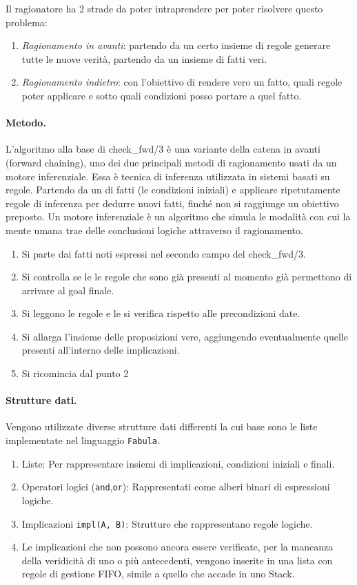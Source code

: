 \documentclass[12pt,twoside]{report}
\begin{document}
Il ragionatore ha 2 strade da poter intraprendere per poter risolvere questo problema:
\begin{enumerate}
    \item \textit{Ragionamento in avanti}: partendo da un certo insieme di regole generare tutte le nuove verità, partendo da un insieme di fatti veri.
    \item \textit{Ragionamento indietro}: con l'obiettivo di rendere vero un fatto, quali regole poter applicare e sotto quali condizioni posso portare a quel fatto.
\end{enumerate}

\paragraph{Metodo.} L'algoritmo alla base di check\_fwd/3 è una variante della catena in avanti (forward chaining), uno dei due principali metodi di ragionamento usati da un motore inferenziale.
Essa è tecnica di inferenza utilizzata in sistemi basati su regole. Partendo da un di fatti (le condizioni iniziali) e applicare ripetutamente regole di inferenza per dedurre nuovi fatti, finché non si raggiunge un obiettivo preposto.
Un motore inferenziale è un algoritmo che simula le modalità con cui la mente umana trae delle conclusioni logiche attraverso il ragionamento.

\begin{enumerate}
    \item Si parte dai fatti noti espressi nel secondo campo del check\_fwd/3.
    \item Si controlla se le le regole che sono già presenti al momento già permettono di arrivare al goal finale.
    \item Si leggono le regole e le si verifica rispetto alle precondizioni date.
    \item Si allarga l'insieme delle proposizioni vere, aggiungendo eventualmente quelle presenti all'interno delle implicazioni.
    \item Si ricomincia dal punto 2
\end{enumerate}

\paragraph{Strutture dati.} Vengono utilizzate diverse strutture dati differenti la cui base sono le liste implementate nel linguaggio \texttt{Fabula}.
\begin{enumerate}
    \item Liste: Per rappresentare insiemi di implicazioni, condizioni iniziali e finali.
    \item Operatori logici (\texttt{and},\texttt{or}): Rappresentati come alberi binari di espressioni logiche.
    \item Implicazioni \texttt{impl(A, B)}: Strutture che rappresentano regole logiche.
    \item Le implicazioni che non possono ancora essere verificate, per la mancanza della veridicità di uno o più antecedenti, vengono inserite in una lista con regole di gestione FIFO, simile a quello che accade in uno Stack. 
\end{enumerate}
\end{document}
